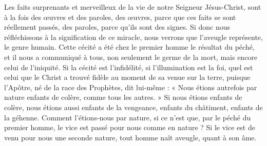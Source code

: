Les faits surprenants et merveilleux de la vie de notre Seigneur Jésus-Christ, sont à la fois des œuvres et des paroles, des œuvres, parce que ces faits se sont réellement passés, des paroles, parce qu’ils sont des signes. Si donc nous réfléchissons à la signification de ce miracle, nous verrons que l’aveugle représente, le genre humain. Cette cécité a été chez le premier homme le résultat du péché, et il nous a communiqué à tous, non seulement le germe de la mort, mais encore celui de l’iniquité. Si la cécité est l’infidélité, si l’illumination est la foi, quel est celui que le Christ a trouvé fidèle au moment de sa venue sur la terre, puisque l’Apôtre, né de la race des Prophètes, dit lui-même : « Nous étions autrefois par nature enfants de colère, comme tous les autres. » Si nous étions enfants de colère, nous étions aussi enfants de la vengeance, enfants du châtiment, enfants de la géhenne. Comment l’étions-nous par nature, si ce n’est que, par le péché du premier homme, le vice est passé pour nous comme en nature ? Si le vice est de venu pour nous une seconde nature, tout homme naît aveugle, quant à son âme.
